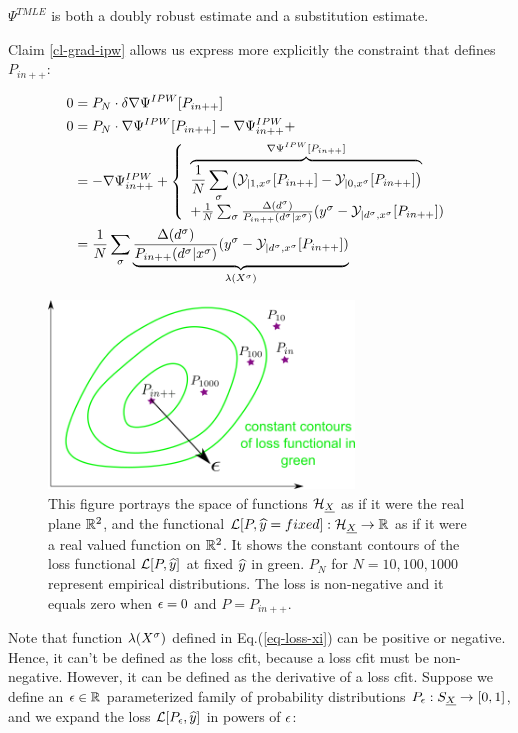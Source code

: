$\Psi^{TMLE}$ is both
a doubly robust estimate and a substitution estimate.

Claim \ref{cl-grad-ipw} allows us
express
more explicitly the constraint that defines $P_{in++}$:

\begin{align}
0 &=
P_N\cdot\delta\nabla\Psi^{IPW}[P_{in++}]
\\
0 &=
P_N\cdot\nabla\Psi^{IPW}[P_{in++}]-\nabla\Psi^{IPW}_{in++}+
\\
&= -\nabla\Psi^{IPW}_{in++}+
\left\{
\begin{array}{l}
\overbrace{
\frac{1}{N}
\sum_\sigma
\left(
{\cal Y}_{|1,x^\sigma}[P_{in++}]
-
{\cal Y}_{|0,x^\sigma}[P_{in++}]
\right)
}^{ \nabla\Psi^{IPW}[P_{in++}]}
\\
+
\frac{1}{N}
\sum_\sigma
\frac{\Delta(d^\sigma)}{P_{in++}(d^\sigma|x^\sigma)}
(y^\sigma-{\cal Y}_{|d^\sigma,x^\sigma}[P_{in++}])
\end{array}
\right.
\\
&=
\frac{1}{N}
\sum_\sigma \underbrace{
\frac{\Delta(d^\sigma)}{P_{in++}(d^\sigma|x^\sigma)}
(y^\sigma-{\cal Y}_{|d^\sigma,x^\sigma}[P_{in++}])
}_{\lambda(X^\sigma)}
\label{eq-loss-xi}
\end{align}


\begin{figure}[h!]
\centering
\includegraphics[width=3.2in]
{targeted-est/targeted-est.png}
\caption{
This figure portrays
the space of functions ${\cal H}_{\underline{X}}$
as if it were the real plane ${ \mathbb{R}}^2$,
and the functional ${\cal L}[P, {\widehat{y}}=fixed]:{\cal H}_{\underline{X}}
\rightarrow{ \mathbb{R}}$
as if it were a real valued function on ${ \mathbb{R}}^2$.
It shows  the constant contours
of the loss functional ${\cal L}[P, {\widehat{y}}]$
at fixed ${\widehat{y}}$ in green.
$P_N$ for $N=10, 100, 1000$
represent empirical distributions.
The loss is non-negative and it equals
zero when $\epsilon=0$ and $P=P_{in++}$.
}
\label{fig-targeted-est}
\end{figure}

Note that function $\lambda(X^\sigma)$ defined in Eq.(\ref{eq-loss-xi})
can be positive or negative. Hence,
 it can't be defined as the loss cfit,
because a loss cfit must be non-negative. However, it can be
defined as the derivative of a loss cfit. Suppose we define an $\epsilon\in{ \mathbb{R}}$
parameterized
family of probability distributions $P_\epsilon:S_{\underline{X}}\rightarrow [0,1]$,
and we expand the loss ${\cal L}[P_\epsilon, {\widehat{y}}]$
in powers of $\epsilon$:

